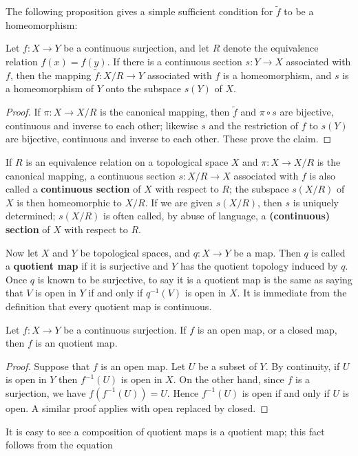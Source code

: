 The following proposition gives a simple sufficient condition for $\tilde{f}$ to be a homeomorphism:
\begin{proposition}\label{topo space induced map on quotient homeomorphism if section exist}
Let $f:X\to Y$ be a continuous surjection, and let $R$ denote the equivalence relation $f(x)=f(y)$. If there is a continuous section $s:Y\to X$ associated with $f$, then the mapping $\tilde{f}:X/R\to Y$ associated with $f$ is a homeomorphism, and $s$ is a homeomorphism of $Y$ onto the subspace $s(Y)$ of $X$.
\end{proposition}
\begin{proof}
If $\pi:X\to X/R$ is the canonical mapping, then $\tilde{f}$ and $\pi\circ s$ are bijective, continuous and inverse to each other; likewise $s$ and the restriction of $f$ to $s(Y)$ are bijective, continuous and inverse to each other. These prove the claim.
\end{proof}
If $R$ is an equivalence relation on a topological space $X$ and $\pi:X\to X/R$ is the canonical mapping, a continuous section $s:X/R\to X$ associated with $f$ is also called a \textbf{continuous section} of $X$ with respect to $R$; the subspace $s(X/R)$ of $X$ is then homeomorphic to $X/R$. If we are given $s(X/R)$, then $s$ is uniquely determined; $s(X/R)$ is often called, by abuse of language, a \textbf{(continuous) section} of $X$ with respect to $R$.\par
Now let $X$ and $Y$ be topological spaces, and $q:X\to Y$ be a map. Then $q$ is called a \textbf{quotient map} if it is surjective and $Y$ has the quotient topology induced by $q$. Once $q$ is known to be surjective, to say it is a quotient map is the same as saying that $V$ is open in $Y$ if and only if $q^{-1}(V)$ is open in $X$. It is immediate from the definition that every quotient map is continuous.
\begin{proposition}
Let $f:X\to Y$ be a continuous surjection. If $f$ is an open map, or a closed map, then $f$ is an quotient map.
\end{proposition}
\begin{proof}
Suppose that $f$ is an open map. Let $U$ be a subset of $Y$. By continuity, if $U$ is open in $Y$ then $f^{-1}(U)$ is open in $X$. On the other hand, since $f$ is a surjection, we have $f(f^{-1}(U))=U$. Hence $f^{-1}(U)$ is open if and only if $U$ is open. A similar proof applies with open replaced by closed.
\end{proof}
It is easy to see a composition of quotient maps is a quotient map; this fact follows from the equation

